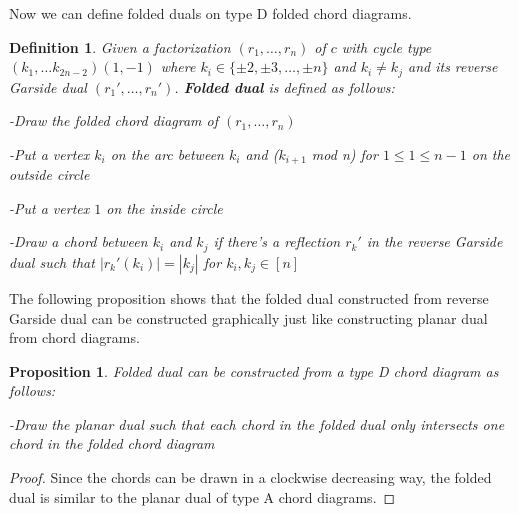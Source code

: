 \documentclass[11pt]{amsart}
\newtheorem{defi}[thm]{Definition}%
\newtheorem{prop}[thm]{Proposition}%
\begin{document}
Now we can define folded duals on type D folded chord diagrams.

\begin{defi}
    Given a factorization $(r_1,\dots,r_n)$ of $c$ with cycle type $(k_1, \dots k_{2n-2})(1, -1)$ where $k_i \in \{\pm2, \pm3, \dots, \pm n\}$ and $k_i \neq k_j$ and its reverse Garside dual $(r_1',\dots,r_n')$. \textbf{Folded dual} is defined as follows:

    -Draw the folded chord diagram of $(r_1,\dots,r_n)$

    -Put a vertex $k_i$ on the arc between $k_i$ and ($k_{i+1}$ mod n) for $1 \leq 1 \leq n-1$ on the outside circle

    -Put a vertex $1$ on the inside circle

    -Draw a chord between $k_i$ and $k_j$ if there's a reflection $r_k'$ in the reverse Garside dual such that $|r_k'(k_i)|=|k_j|$ for $k_i,k_j \in [n]$
\end{defi}

The following proposition shows that the folded dual constructed from reverse Garside dual can be constructed graphically just like constructing planar dual from chord diagrams.

\begin{prop}
    Folded dual can be constructed from a type D chord diagram as follows:
    
    -Draw the planar dual such that each chord in the folded dual only intersects one chord in the folded chord diagram
\end{prop}

\begin{proof}
    Since the chords can be drawn in a clockwise decreasing way, the folded dual is similar to the planar dual of type A chord diagrams.
\end{proof}
\end{document}
